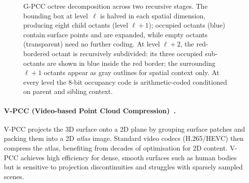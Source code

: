 \begin{figure}[t]
\caption{%
  G-PCC octree decomposition across two recursive stages.
  The bounding box at level~$\ell$ is halved in each spatial dimension,
  producing eight child octants (level $\ell{+}1$); occupied octants
  (blue) contain surface points and are expanded, while empty octants
  (transparent) need no further coding.
  At level $\ell{+}2$, the red-bordered octant is recursively
  subdivided: its three occupied sub-octants are shown in blue inside
  the red border; the surrounding $\ell{+}1$ octants appear as gray
  outlines for spatial context only.
  At every level the 8-bit occupancy code is arithmetic-coded
  conditioned on parent and sibling context.
}
\label{fig:gpcc-octree}
\end{figure}

\paragraph{V-PCC (Video-based Point Cloud Compression)~\cite{schwarz2018emerging}.}
V-PCC projects the 3D surface onto a 2D plane by grouping surface patches
and packing them into a 2D \emph{atlas} image.
Standard video codecs (H.265/HEVC) then compress the atlas, benefiting from
decades of optimisation for 2D content.
V-PCC achieves high efficiency for dense, smooth surfaces such as human
bodies but is sensitive to projection discontinuities and struggles with
sparsely sampled scenes.

